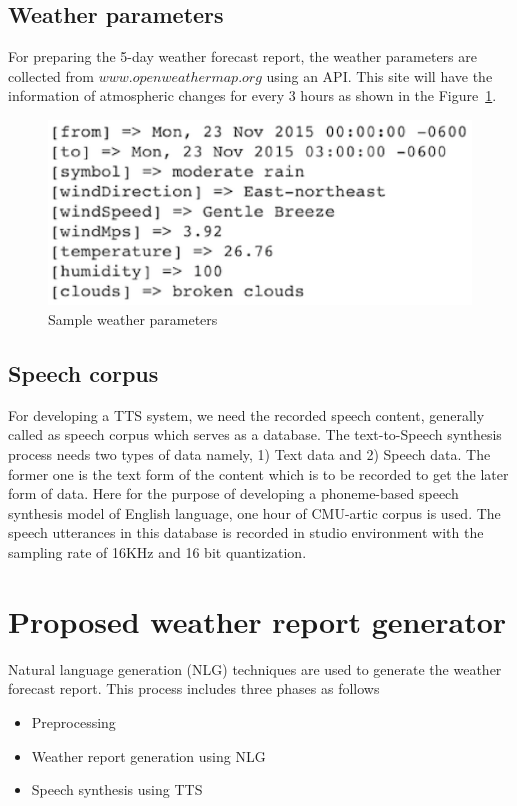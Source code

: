 \documentclass{article}
\begin{document}
\clearpage

\subsection{Weather parameters}
\label{ssec:weatherParams}
For preparing the 5-day weather forecast report, the weather parameters are collected from $www.openweathermap.org$ using an API. This site will have the information of atmospheric changes for every 3 hours as shown in the Figure~\ref{fig:sampleData}.

\begin{figure}[h!tb]
\centering
\includegraphics[scale=0.5]{figures/weatherData.eps}
\caption{Sample weather parameters}
\label{fig:sampleData}
\end{figure}

\subsection{Speech corpus}
\label{ssec:speechCorpus}

For developing a TTS system, we need the recorded speech content, generally called
as speech corpus which serves as a database. The text-to-Speech synthesis process needs
two types of data namely, 1) Text data and 2) Speech data. The former one is the text
form of the content which is to be recorded to get the later form of data. Here for the 
purpose of developing a phoneme-based speech synthesis model of English language, one
hour of CMU-artic corpus is used. The speech utterances in this database is recorded in 
studio environment with the sampling rate of 16KHz and 16 bit quantization.

\section{Proposed weather report generator}

Natural language generation (NLG) techniques are used to generate the weather forecast report. This process includes three phases as follows
\begin{itemize}
\item Preprocessing
\item Weather report generation using NLG
\item Speech synthesis using TTS
\end{itemize}
\end{document}
